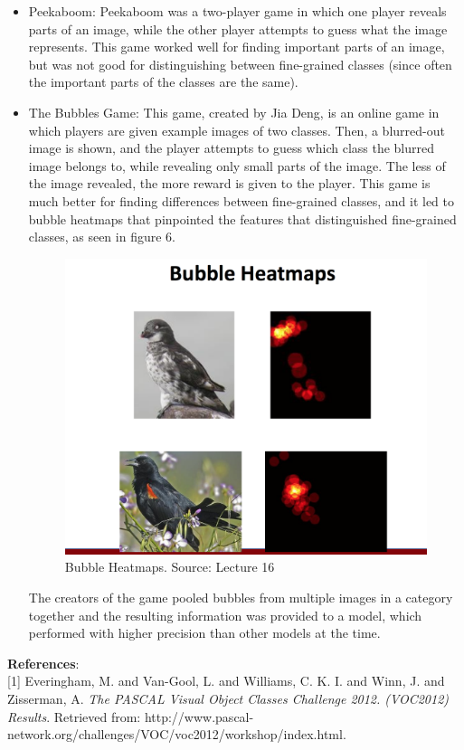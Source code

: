 \documentclass[11pt]{article}
\begin{document}
\begin{itemize}
\item Peekaboom: Peekaboom was a two-player game in which one player reveals parts of an image, while the other player attempts to guess what the image represents. This game worked well for finding important parts of an image, but was not good for distinguishing between fine-grained classes (since often the important parts of the classes are the same).
\item The Bubbles Game: This game, created by Jia Deng, is an online game in which players are given example images of two classes. Then, a blurred-out image is shown, and the player attempts to guess which class the blurred image belongs to, while revealing only small parts of the image. The less of the image revealed, the more reward is given to the player. This game is much better for finding differences between fine-grained classes, and it led to bubble heatmaps that pinpointed the features that distinguished fine-grained classes, as seen in figure 6.
\begin{figure}[h]
  \centering
  \includegraphics[scale=0.6]{heatmap.png} 
  \caption{Bubble Heatmaps. Source: Lecture 16}
\end{figure}
The creators of the game pooled bubbles from multiple images in a category together and the resulting information was provided to a model, which performed with higher precision than other models at the time.
\end{itemize}
\textbf{References}:\\
{[1]} Everingham, M. and Van-Gool, L. and Williams, C. K. I. and Winn, J. and Zisserman, A. \textit{The PASCAL Visual Object Classes Challenge 2012. (VOC2012) Results}. Retrieved from: http://www.pascal-network.org/challenges/VOC/voc2012/workshop/index.html.
\end{document}
